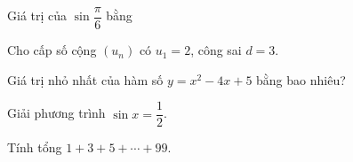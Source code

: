 \documentclass[12pt]{article}
\begin{document}
\taodaude

\phantn
\begin{tn}
Giá trị của $\sin\dfrac{\pi}{6}$ bằng
\end{tn}

\phands
\begin{ds}
Cho cấp số cộng $(u_n)$ có $u_1=2$, công sai $d=3$.
\end{ds}

\phantln
\begin{tln}
Giá trị nhỏ nhất của hàm số $y=x^2-4x+5$ bằng bao nhiêu?
\end{tln}

\phantl[2,0]
\begin{bt}
Giải phương trình $\sin x=\dfrac12$.
\end{bt}
\begin{bt}
Tính tổng $1+3+5+\cdots+99$.
\end{bt}
\bangdapan
\end{document}
